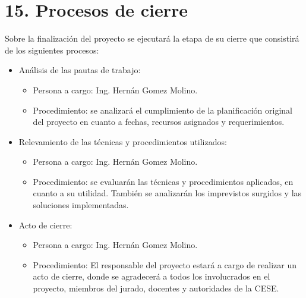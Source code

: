 \documentclass[
11pt, %
codirector, %
]{charter}
\begin{document}
\section{15. Procesos de cierre}    
\label{sec:cierre}

Sobre la finalización del proyecto se ejecutará la etapa de su cierre que consistirá de los siguientes procesos:  

\begin{itemize}
	\item Análisis de las pautas de trabajo:
	\begin{itemize}
		\item Persona a cargo: Ing. Hernán Gomez Molino.
		\item Procedimiento: se analizará el cumplimiento de la planificación original del proyecto en cuanto a fechas, recursos asignados y requerimientos. 
		\end{itemize}
	\item Relevamiento de las técnicas y procedimientos utilizados:
	\begin{itemize}
		\item Persona a cargo: Ing. Hernán Gomez Molino. 
		\item Procedimiento: se evaluarán las técnicas y procedimientos aplicados, en cuanto a su utilidad. También se analizarán los imprevistos surgidos y las soluciones implementadas.
	\end{itemize}
	\item Acto de cierre:
	\begin{itemize}
		\item Persona a cargo: Ing. Hernán Gomez Molino. 
		\item Procedimiento: El responsable del proyecto estará a cargo de realizar un acto de cierre, donde se agradecerá a todos los involucrados en el proyecto, miembros del jurado, docentes y autoridades de la CESE. 
	\end{itemize}
\end{itemize}
\end{document}
